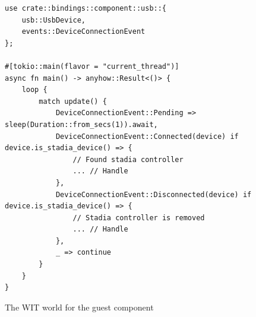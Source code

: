 \begin{code}
\begin{verbatim}
use crate::bindings::component::usb::{
	usb::UsbDevice, 
	events::DeviceConnectionEvent
};

#[tokio::main(flavor = "current_thread")]
async fn main() -> anyhow::Result<()> {
	loop {
		match update() {
			DeviceConnectionEvent::Pending => sleep(Duration::from_secs(1)).await,
			DeviceConnectionEvent::Connected(device) if device.is_stadia_device() => {
				// Found stadia controller
				... // Handle
			},
			DeviceConnectionEvent::Disconnected(device) if device.is_stadia_device() => {
				// Stadia controller is removed
				... // Handle
			},
			_ => continue
		}
	}
}
\end{verbatim} 
\caption{The \acrshort{WIT} world for the guest component}
\label{code:calling_usb_api}
\end{code}


